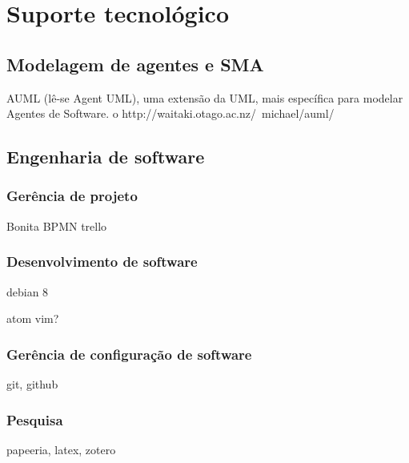 \chapter[Suporte tecnológico]{Suporte tecnológico}\label{ch:suporte}

\section{Modelagem de agentes e SMA}



AUML (lê-se Agent UML), uma extensão da UML,
mais específica para modelar Agentes de Software.
o http://waitaki.otago.ac.nz/~michael/auml/



\section{Engenharia de software}

\subsection{Gerência de projeto}

Bonita BPMN
trello

\subsection{Desenvolvimento de software}

debian 8

atom
vim?

\subsection{Gerência de configuração de software}

git, github

\subsection{Pesquisa}

papeeria, latex, zotero


